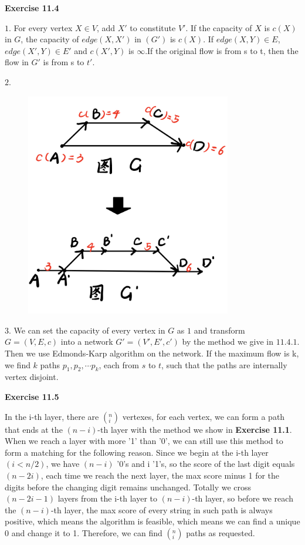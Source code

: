 \documentclass{article} %
\begin{document}
\textbf{Exercise 11.4}\par
    $1.$ For every vertex $X \in V$, add $X\prime$ to constitute $V\prime$. If the capacity of $X$ is $c(X)$ in $G$, the capacity of $edge(X,X\prime)$ in $(G\prime)$ is $c(X).$ If $edge(X,Y)\in E$, $edge(X\prime,Y)\in E\prime$ and $c(X\prime,Y)$ is $\infty$.If the original flow is from s to t, then the flow in $G\prime$ is from s to $t\prime$.\par
    $2.$
    \begin{figure}[H]
  	\centering
  	\includegraphics[width=9cm]{11_4_2.png}
  	\caption{}
  	\label{}
  	\end{figure}


    $3.$ We can set the capacity of every vertex in $G$ as $1$ and transform $G = (V,E,c)$ into a network $G\prime = (V\prime,E\prime,c\prime)$ by the method we give in $11.4.1$. Then we use Edmonds-Karp algorithm on the network. If the maximum flow is k, we find $k$ paths $p_1,p_2,\cdots p_k$, each from $s$ to $t$, such that the paths are internally vertex disjoint.\par

 \textbf{Exercise 11.5}\par	
	In the i-th layer, there are $(^n _i)$ vertexes, for each vertex, we can form a path that ends at the $(n-i)$-th layer with the method we show in \textbf{Exercise 11.1}. When we reach a layer with more '1' than '0', we can still use this method to form a matching for the following reason. Since we begin at the i-th layer$(i<n/2)$, we have $(n-i)$ '0's and i '1's, so the score of the last digit equals $(n-2i)$, each time we reach the next layer, the max score minus 1 for the  digits before the changing digit remains unchanged. Totally we cross $(n-2i-1)$ layers from the i-th layer to $(n-i)$-th layer, so before we reach the $(n-i)$-th layer, the max score of every string in such path is always positive, which means the algorithm is feasible, which means we can find a unique 0 and change it to 1. Therefore, we can find $(^n _i)$ paths as requested.\par
\end{document}
